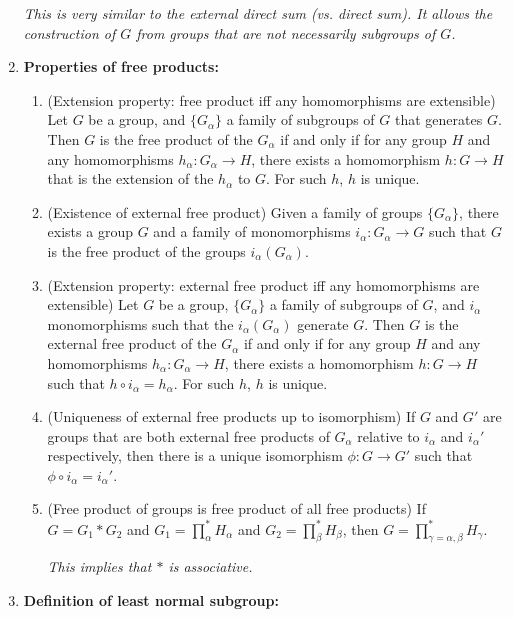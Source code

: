 \documentclass[letterpaper, 12pt]{article}
\begin{document}
\begin{enumerate}[resume]
{            \textit{This is very similar to the external direct sum (vs. direct sum). It allows the construction of $G$ from groups that are not necessarily subgroups of $G$.}}
        \item \textbf{Properties of free products:}
            \begin{enumerate}
            \item (Extension property: free product iff any homomorphisms are extensible) Let $G$ be a group, and $\{G_\alpha\}$ a family of subgroups of $G$ that generates $G$. Then $G$ is the free product of the $G_\alpha$ if and only if for any group $H$ and any homomorphisms $h_\alpha : G_\alpha \to H$, there exists a homomorphism $h: G\to H$ that is the extension of the $h_\alpha$ to $G$. For such $h$, $h$ is unique.
            \item (Existence of external free product) Given a family of groups $\{G_\alpha\}$, there exists a group $G$ and a family of monomorphisms $i_\alpha : G_\alpha \to G$ such that $G$ is the free product of the groups $i_\alpha(G_\alpha)$.
            \item (Extension property: external free product iff any homomorphisms are extensible) Let $G$ be a group, $\{G_\alpha\}$ a family of subgroups of $G$, and $i_\alpha$ monomorphisms such that the $i_\alpha(G_\alpha)$ generate $G$. Then $G$ is the external free product of the $G_\alpha$ if and only if for any group $H$ and any homomorphisms $h_\alpha : G_\alpha \to H$, there exists a homomorphism $h: G\to H$ such that $h\circ i_\alpha = h_\alpha$. For such $h$, $h$ is unique.
            \item (Uniqueness of external free products up to isomorphism) If $G$ and $G'$ are groups that are both external free products of $G_\alpha$ relative to $i_\alpha$ and $i_\alpha'$ respectively, then there is a unique isomorphism $\phi : G\to G'$ such that $\phi\circ i_\alpha = i_\alpha'$.
            \item (Free product of groups is free product of all free products) If $G = G_1 * G_2$ and $G_1 = \prod_\alpha^* H_\alpha$ and $G_2 = \prod_\beta^* H_\beta$, then $G = \prod_{\gamma = \alpha, \beta}^* H_\gamma$.

            \textit{This implies that $*$ is associative.}
            \end{enumerate}
        \item \textbf{Definition of least normal subgroup:}


\end{enumerate}
\end{document}
